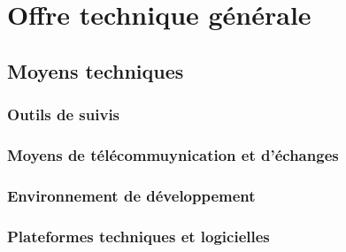 	\chapter{Offre technique générale}
	
	
	\newpage
	
	

	\section{Moyens techniques}
	\subsection{Outils de suivis}
	\subsection{Moyens de télécommuynication et d'échanges}
	\subsection{Environnement de développement}
	\subsection{Plateformes techniques et logicielles}